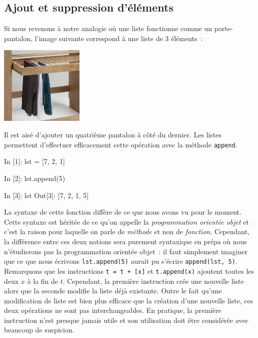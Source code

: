 \documentclass{magnolia}
\begin{document}
\subsection{Ajout et suppression d'éléments}

Si nous revenons à notre analogie où une liste fonctionne comme un porte-pantalon,
l'image suivante correspond à une liste de 3 éléments~:

\begin{center}
\includegraphics[width=0.3\textwidth]{../../Commun/Images/python-cours-jeans-tabdyn}
\end{center}
\noindent
Il est aisé d'ajouter un quatrième pantalon à côté du dernier. Les listes permettent
d'effectuer efficacement cette opération avec la méthode \verb!append!.

\begin{pythoncode}
In [1]: lst = [7, 2, 1]

In [2]: lst.append(5)

In [3]: lst
Out[3]: [7, 2, 1, 5]
\end{pythoncode}
\noindent
La syntaxe de cette fonction diffère de ce que nous avons vu pour le
moment. Cette syntaxe est héritée de ce qu'on appelle la \emph{programmation orientée objet} et c'est
la raison pour laquelle on parle de \emph{méthode} et non de \emph{fonction}. Cependant, la différence
entre ces deux notions sera purement syntaxique en prépa où nous n'étudierons pas la programmation
orientée objet~: il faut simplement imaginer que ce que nous écrivons \verb!lst.append(5)! aurait
pu s'écrire \verb!append(lst, 5)!.\\

Remarquons que les instructions \verb!t = t + [x]! et \verb!t.append(x)! ajoutent toutes les deux $x$ à la fin de 
$t$. Cependant, la première instruction crée une nouvelle liste alors que la seconde modifie la
liste déjà existante. Outre le fait qu'une modification de liste est bien plus efficace que la création
d'une nouvelle liste, ces deux opérations ne sont pas interchangeables.
En pratique, la première instruction n'est presque jamais utile et son utilisation doit être considérée avec
beaucoup de suspicion.\\
\end{document}
